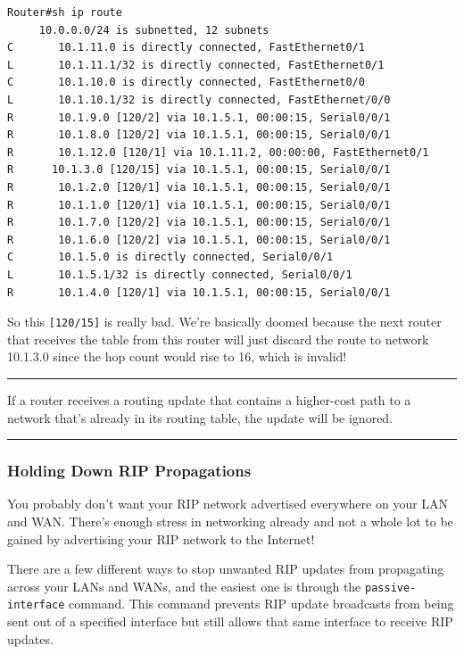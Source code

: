 \begin{verbatim}
Router#sh ip route
     10.0.0.0/24 is subnetted, 12 subnets
C       10.1.11.0 is directly connected, FastEthernet0/1
L       10.1.11.1/32 is directly connected, FastEthernet0/1
C       10.1.10.0 is directly connected, FastEthernet0/0
L       10.1.10.1/32 is directly connected, FastEthernet/0/0
R       10.1.9.0 [120/2] via 10.1.5.1, 00:00:15, Serial0/0/1
R       10.1.8.0 [120/2] via 10.1.5.1, 00:00:15, Serial0/0/1
R       10.1.12.0 [120/1] via 10.1.11.2, 00:00:00, FastEthernet0/1
R      10.1.3.0 [120/15] via 10.1.5.1, 00:00:15, Serial0/0/1
R       10.1.2.0 [120/1] via 10.1.5.1, 00:00:15, Serial0/0/1
R       10.1.1.0 [120/1] via 10.1.5.1, 00:00:15, Serial0/0/1
R       10.1.7.0 [120/2] via 10.1.5.1, 00:00:15, Serial0/0/1
R       10.1.6.0 [120/2] via 10.1.5.1, 00:00:15, Serial0/0/1
C       10.1.5.0 is directly connected, Serial0/0/1
L       10.1.5.1/32 is directly connected, Serial0/0/1
R       10.1.4.0 [120/1] via 10.1.5.1, 00:00:15, Serial0/0/1
\end{verbatim}

So this \texttt{{[}120/15{]}} is really bad. We're basically doomed
because the next router that receives the table from this router will
just discard the route to network 10.1.3.0 since the hop count would
rise to 16, which is invalid!

\begin{center}\rule{0.5\linewidth}{0.5pt}\end{center}

If a router receives a routing update
that contains a higher-cost path to a network that's already in its
routing table, the update will be ignored.

\begin{center}\rule{0.5\linewidth}{0.5pt}\end{center}

\subsubsection[Holding Down RIP
Propagations]{\texorpdfstring{\protect\hypertarget{c09.xhtmlux5cux23c09-sec-16}{}{}Holding
Down RIP Propagations}{Holding Down RIP Propagations}}

You probably don't want your RIP network advertised everywhere on your
LAN and WAN. There's enough stress in networking already and not a whole
lot to be gained by advertising your RIP network to the Internet!

\protect\hypertarget{c09.xhtmlux5cux23Page_397}{}{}There are a few
different ways to stop unwanted RIP updates from propagating across your
LANs and WANs, and the easiest one is through the
\texttt{passive-interface} command. This command prevents RIP update
broadcasts from being sent out of a specified interface but still allows
that same interface to receive RIP updates.

